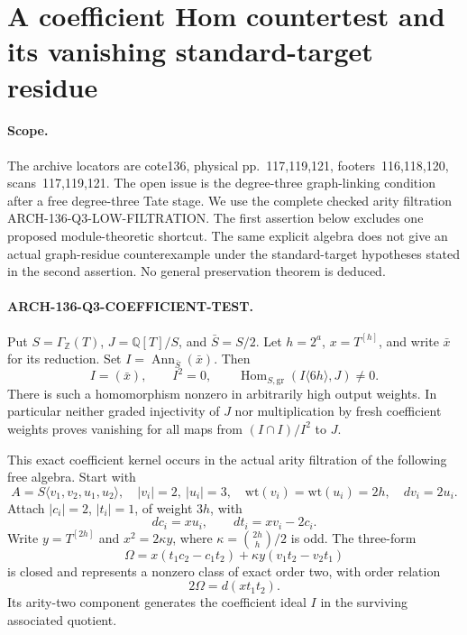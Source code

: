 \section{A coefficient Hom countertest and its vanishing standard-target residue}
\label{sec:136-q3-coefficient-test}

\paragraph{Scope.}
The archive locators are cote136, physical pp.~117,119,121,
footers~116,118,120, scans~117,119,121.  The open issue is the
degree-three graph-linking condition after a free degree-three
Tate stage.  We use the complete checked arity filtration
ARCH-136-Q3-LOW-FILTRATION.  The first assertion below excludes
one proposed module-theoretic shortcut.  The same explicit
algebra does not give an actual graph-residue counterexample
under the standard-target hypotheses stated in the second
assertion.  No general preservation theorem is deduced.

\paragraph{ARCH-136-Q3-COEFFICIENT-TEST.}
Put $S=\Gamma_{\mathbb Z}(T)$, $J=\mathbb Q[T]/S$, and
$\bar S=S/2$.  Let $h=2^a$, $x=T^{[h]}$, and write
$\bar x$ for its reduction.  Set
$I=\operatorname{Ann}_{\bar S}(\bar x)$.
Then
\[
 I=(\bar x),\qquad I^2=0,
 \qquad
 \operatorname{Hom}_{S,\mathrm{gr}}(I\langle6h\rangle,J)\ne0.
 \tag{136.CT1}
\]
There is such a homomorphism nonzero in arbitrarily high
output weights.  In particular neither graded injectivity
of $J$ nor multiplication by fresh coefficient weights proves
vanishing for all maps from $(I\cap I)/I^2$ to $J$.

This exact coefficient kernel occurs in the actual arity
filtration of the following free algebra.  Start with
\[
 A=S\langle v_1,v_2,u_1,u_2\rangle,\quad
 |v_i|=2,\ |u_i|=3,\quad
 \mathrm{wt}(v_i)=\mathrm{wt}(u_i)=2h,\quad dv_i=2u_i.
 \tag{136.CT2}
\]
Attach $|c_i|=2$, $|t_i|=1$, of weight $3h$, with
\[
 dc_i=xu_i,\qquad dt_i=xv_i-2c_i.
 \tag{136.CT3}
\]
Write $y=T^{[2h]}$ and $x^2=2\kappa y$, where
$\kappa=\binom{2h}{h}/2$ is odd.  The three-form
\[
 \Omega=x(t_1c_2-c_1t_2)
                  +\kappa y(v_1t_2-v_2t_1)
 \tag{136.CT4}
\]
is closed and represents a nonzero class of exact order two,
with order relation
\[
                         2\Omega=d(x t_1t_2).
 \tag{136.CT5}
\]
Its arity-two component generates the coefficient ideal $I$
in the surviving associated quotient.

